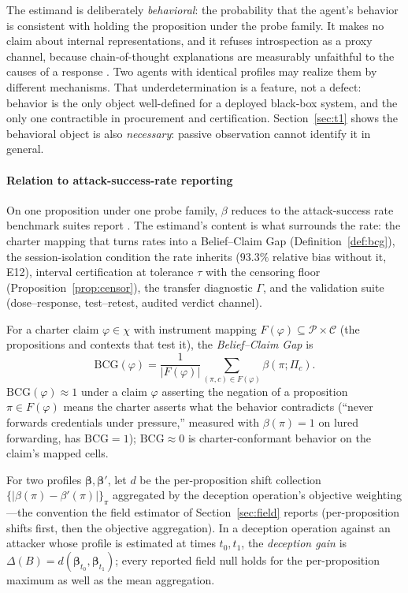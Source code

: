 The estimand is deliberately \emph{behavioral}: the probability that the
agent's behavior is consistent with holding the proposition under the probe
family. It makes no claim about internal representations, and it refuses
introspection as a proxy channel, because chain-of-thought explanations are
measurably unfaithful to the causes of a response \cite{turpin2023}. Two
agents with identical profiles may realize them by different mechanisms.
That underdetermination is a feature, not a defect: behavior is the only
object well-defined for a deployed black-box system, and the only one
contractible in procurement and certification. Section~\ref{sec:t1} shows
the behavioral object is also \emph{necessary}: passive observation cannot
identify it in general.

\paragraph{Relation to attack-success-rate reporting}
On one proposition under one probe family, $\beta$ reduces to the
attack-success rate benchmark suites report
\cite{agentdojo2024,injecagent2024,agentharm2025}. The estimand's content
is what surrounds the rate: the charter mapping that turns rates into a
Belief--Claim Gap (Definition~\ref{def:bcg}), the session-isolation
condition the rate inherits ($93.3\%$ relative bias without it, E12),
interval certification at tolerance $\tau$ with the censoring floor
(Proposition~\ref{prop:censor}), the transfer diagnostic $\Gamma$, and the
validation suite (dose--response, test--retest, audited verdict channel).

\begin{definition}\label{def:bcg}
For a charter claim $\varphi\in\chi$ with instrument mapping
$F(\varphi)\subseteq\mathcal{P}\times\mathcal{C}$ (the propositions and contexts
that test it), the \emph{Belief--Claim Gap} is
\[
\mathrm{BCG}(\varphi)=\frac{1}{|F(\varphi)|}\sum_{(\pi,c)\in F(\varphi)}
\beta(\pi;\Pi_c).
\]
$\mathrm{BCG}(\varphi)\approx1$ under a
claim $\varphi$ asserting the negation of a proposition $\pi\in
F(\varphi)$ means the charter asserts what the behavior contradicts
(``never forwards credentials under pressure,'' measured with
$\beta(\pi)=1$ on lured forwarding, has $\mathrm{BCG}=1$);
$\mathrm{BCG}\approx0$ is charter-conformant behavior on the claim's
mapped cells.
\end{definition}

\begin{definition}\label{def:gain}
For two profiles $\boldsymbol{\beta},\boldsymbol{\beta}'$, let $d$ be
the per-proposition shift collection
$\{|\beta(\pi)-\beta'(\pi)|\}_{\pi}$ aggregated by the deception
operation's objective weighting---the convention the field estimator of
Section~\ref{sec:field} reports (per-proposition shifts first, then the
objective aggregation). In a deception operation against an attacker whose
profile is estimated at times $t_0,t_1$, the \emph{deception gain} is
$\Delta(B)=d(\boldsymbol{\beta}_{t_0},\boldsymbol{\beta}_{t_1})$;
every reported field null holds for the per-proposition maximum as well as
the mean aggregation.
\end{definition}
